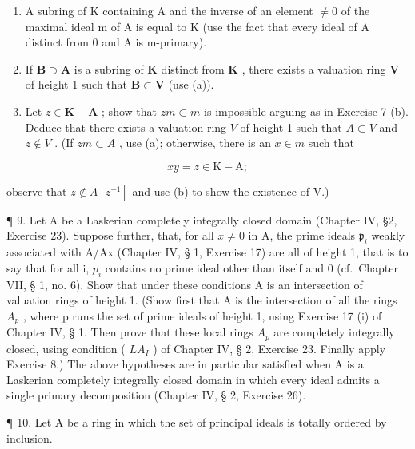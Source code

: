 \begin{enumerate}
\def\labelenumi{(\alph{enumi})}
\item
  A subring of K containing A and the inverse of an element \(\neq0\) of the maximal ideal m of A is equal to K (use the fact that every ideal of A distinct from 0 and A is m-primary).
\item
  If \(\mathbf{B} \supset \mathbf{A}\) is a subring of \(\mathbf{K}\) distinct from \(\mathbf{K}\) , there exists a valuation ring \(\mathbf{V}\) of height 1 such that \(\mathbf{B} \subset \mathbf{V}\) (use (a)).
\item
  Let \(z \in \mathbf{K} - \mathbf{A}\) ; show that \(zm \subset m\) is impossible arguing as in Exercise 7 (b). Deduce that there exists a valuation ring \(V\) of height 1 such that \(A \subset V\) and \(z \notin V\) . (If \(zm \subset A\) , use (a); otherwise, there is an \(x \in m\) such that
\end{enumerate}

\[
x y = z \in \mathrm{K} - \mathrm{A};
\]

observe that \(z \notin A[z^{-1}]\) and use (b) to show the existence of V.)

¶ 9. Let A be a Laskerian completely integrally closed domain (Chapter IV, §2, Exercise 23). Suppose further, that, for all \(x \neq 0\) in A, the prime ideals \(\mathfrak{p}_i\) weakly associated with A/Ax (Chapter IV, § 1, Exercise 17) are all of height 1, that is to say that for all i, \(p_{i}\) contains no prime ideal other than itself and 0 (cf.~Chapter VII, § 1, no. 6). Show that under these conditions A is an intersection of valuation rings of height 1. (Show first that A is the intersection of all the rings \(A_{p}\) , where p runs the set of prime ideals of height 1, using Exercise 17 (i) of Chapter IV, § 1. Then prove that these local rings \(A_{p}\) are completely integrally closed, using condition ( \(LA_{I}\) ) of Chapter IV, § 2, Exercise 23. Finally apply Exercise 8.) The above hypotheses are in particular satisfied when A is a Laskerian completely integrally closed domain in which every ideal admits a single primary decomposition (Chapter IV, § 2, Exercise 26).

¶ 10. Let A be a ring in which the set of principal ideals is totally ordered by inclusion.

